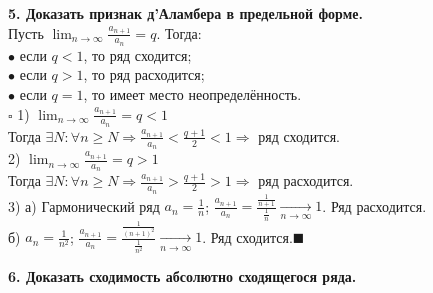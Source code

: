 \documentclass[11pt,a4paper]{article}
\newcommand{\proof}{$\square$ }
\newcommand{\qed}{\hfill$\blacksquare$}
\begin{document}
\textbf{5. Доказать признак д’Аламбера в предельной форме.\\}
Пусть $\lim_{n \to \infty} \frac{a_{n+1}}{a_n} = q$. Тогда:\\
$\bullet$ если $q < 1$, то ряд сходится;\\
$\bullet$ если $q > 1$, то ряд расходится;\\
$\bullet$ если $q = 1$, то имеет место неопределённость.\\
\proof 1) $\lim_{n \to \infty} \frac{a_{n+1}}{a_n} = q < 1$\\
Тогда $\exists N : \forall n \geq N \Rightarrow \frac{a_{n+1}}{a_n} < \frac{q+1}{2} < 1 \Rightarrow$ ряд сходится.\\
2) $\lim_{n \to \infty} \frac{a_{n+1}}{a_n} = q > 1$\\
Тогда $\exists N : \forall n \geq N \Rightarrow \frac{a_{n+1}}{a_n} > \frac{q+1}{2} > 1 \Rightarrow$ ряд расходится.\\
3) а) Гармонический ряд $a_n = \frac{1}{n}$; $\frac{a_{n+1}}{a_n} = \frac{\frac{1}{n+1}}{\frac{1}{n}} \xrightarrow[n \to \infty]{} 1$. Ряд расходится.\\
б) $a_n = \frac{1}{n^2}$; $\frac{a_{n+1}}{a_n} = \frac{\frac{1}{(n+1)^2}}{\frac{1}{n^2}} \xrightarrow[n \to \infty]{} 1$. Ряд сходится.\qed

\textbf{6. Доказать сходимость абсолютно сходящегося ряда.\\}
\end{document}
